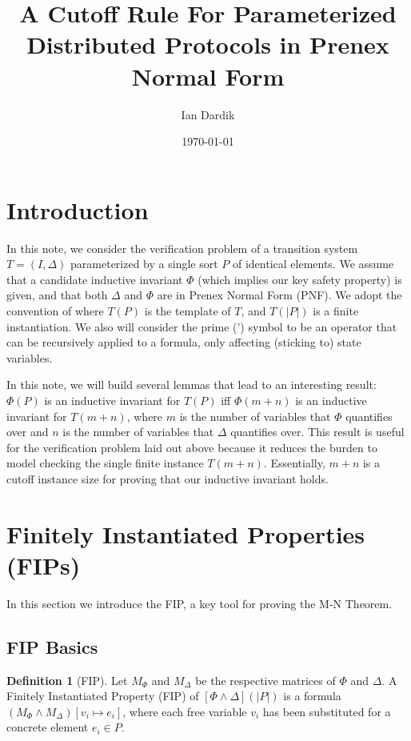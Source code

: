 \documentclass[12pt]{article}
\title{A Cutoff Rule For Parameterized Distributed Protocols in Prenex Normal Form}
\author{Ian Dardik}
\date{\today}
\theoremstyle{definition}
\newtheorem{definition}{Definition}
\theoremstyle{remark}
\begin{document}
\maketitle

\section{Introduction}
In this note, we consider the verification problem of a transition system $T=(I,\Delta)$ parameterized by a single sort $P$ of identical elements.  We assume that a candidate inductive invariant $\Phi$ (which implies our key safety property) is given, and that both $\Delta$ and $\Phi$ are in Prenex Normal Form (PNF).  We adopt the convention of \cite{goel2021symmetry} where $T(P)$ is the template of $T$, and $T(|P|)$ is a finite instantiation.  We also will consider the prime (') symbol to be an operator that can be recursively applied to a formula, only affecting (sticking to) state variables.

In this note, we will build several lemmas that lead to an interesting result: $\Phi(P)$ is an inductive invariant for $T(P)$ iff $\Phi(m+n)$ is an inductive invariant for $T(m+n)$, where $m$ is the number of variables that $\Phi$ quantifies over and $n$ is the number of variables that $\Delta$ quantifies over.  This result is useful for the verification problem laid out above because it reduces the burden to model checking the single finite instance $T(m+n)$.  Essentially, $m+n$ is a cutoff instance size for proving that our inductive invariant holds.


\section{Finitely Instantiated Properties (FIPs)}
In this section we introduce the FIP, a key tool for proving the M-N Theorem.

\subsection{FIP Basics}

\begin{definition}[FIP]
  Let $M_{\Phi}$ and $M_{\Delta}$ be the respective matrices of $\Phi$ and $\Delta$.  A Finitely Instantiated Property (FIP) of $[\Phi\land\Delta](|P|)$ is a formula $(M_{\Phi} \land M_{\Delta})[v_i \mapsto e_i]$, where each free variable $v_i$ has been substituted for a concrete element $e_i \in P$.  
\end{definition}
\end{document}
